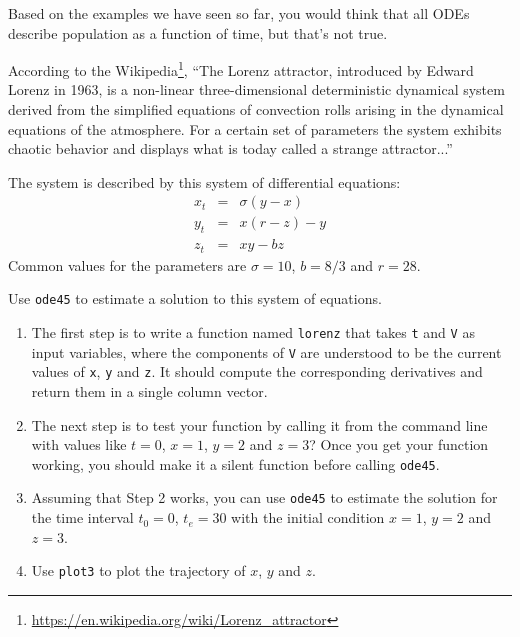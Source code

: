 \documentclass{book}
\begin{document}
\begin{ex}

Based on the examples we have seen so far, you would think that
all ODEs describe population as
a function of time, but that's not true.

According to the
Wikipedia\footnote{\url{https://en.wikipedia.org/wiki/Lorenz_attractor}},
``The Lorenz attractor, introduced by Edward Lorenz in 1963, is a
non-linear three-dimensional deterministic dynamical system derived
from the simplified equations of convection rolls arising in the
dynamical equations of the atmosphere. For a certain set of parameters
the system exhibits chaotic behavior and displays what is today called
a strange attractor...''

The system is described by this system of differential equations:
%
\begin{eqnarray}
x_t &=& \sigma (y - x)  \\
y_t &=& x (r - z) - y   \\
z_t &=& xy - b z
\end{eqnarray}
%
Common values for the parameters are $\sigma = 10$, $b = 8/3$ and $r=28$.

Use {\tt ode45} to estimate a solution to this
system of equations.  


\begin{enumerate}

\item  The first step is to write a function named {\tt lorenz} that
takes {\tt t} and {\tt V} as input variables, where the components
of {\tt V} are understood to be the current values of {\tt x},
{\tt y} and {\tt z}.  It should compute the corresponding derivatives
and return them in a single column vector.

\item The next step is to test your function by calling it from
the command line with values like
$t=0$, $x=1$, $y=2$ and $z=3$?  Once you get your function working,
you should make it a silent function before calling {\tt ode45}.

\item Assuming that Step 2 works, you can use {\tt ode45}
to estimate the solution for the time interval $t_0 = 0$, $t_e = 30$
with the initial condition $x=1$, $y=2$ and $z=3$.

\item Use {\tt plot3} to plot the trajectory of
$x$, $y$ and $z$.

\end{enumerate}

\end{ex}
\end{document}

